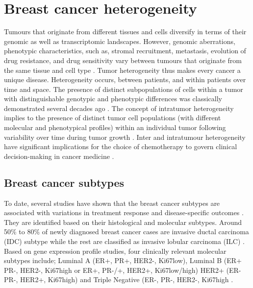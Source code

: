 
\section{Breast cancer heterogeneity}
 Tumours that originate from different tissues and cells diversify in terms of their genomic as well as transcriptomic landscapes.
 However, genomic aberrations, phenotypic characteristics, such as, stromal recruitment, metastasis, evolution of drug resistance, and drug sensitivity vary between tumours that originate from the same tissue and cell type \cite{vogelstein2013cancer}. 
Tumor heterogeneity thus makes every cancer a unique disease. Heterogeneity occurs, between patients, and within patients over time and space. 
The presence of distinct subpopulations of cells within a tumor with distinguishable genotypic and phenotypic differences was classically demonstrated several decades ago \cite{fidler1978tumor}.
The concept of intratumor heterogeneity implies to the presence of distinct tumor cell populations (with different molecular and phenotypical profiles) within an individual tumor following variability over time during tumor growth \cite{ellsworth2017molecular, welch2016tumor}. Inter and intratumour heterogeneity have significant implications for the choice of chemotherapy to govern clinical decision-making in cancer medicine \cite{bedard2013tumour}.




\subsection{Breast cancer subtypes}
To date, several studies have shown that the breast cancer subtypes are associated with variations in treatment response and disease-specific outcomes \cite{metzger2013patterns, arvold2011age}. 
They are identified based on their histological and molecular subtypes. 
Around 50\% to 80\% of newly diagnosed breast cancer cases are
invasive ductal carcinoma (IDC) subtype while the rest are
classified as invasive lobular carcinoma (ILC) \cite{henry2019breast}. Based on  gene expression profile studies, four clinically relevant molecular subtypes include; Luminal A (ER+, PR+, HER2-, Ki67low), Luminal B (ER+
PR-, HER2-, Ki67high or ER+, PR-/+, HER2+, Ki67low/high) HER2+ (ER-
PR-, HER2+, Ki67high) and Triple Negative (ER-, PR-, HER2-, Ki67high \cite{nadia2017gm, do2020histological}.


